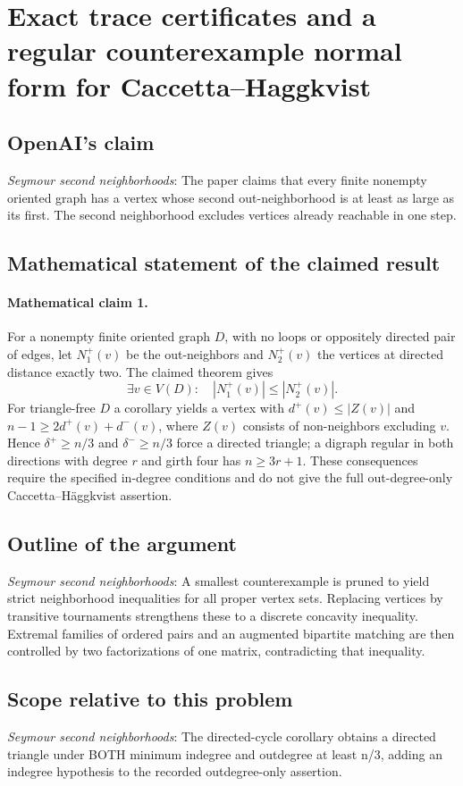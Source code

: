 \documentclass[11pt]{article}
\begin{document}
\section*{Exact trace certificates and a regular counterexample normal form for Caccetta--Haggkvist}

\subsection{OpenAI's claim}
\textit{Seymour second neighborhoods}: The paper claims that every finite nonempty oriented graph has a vertex whose second out-neighborhood is at least as large as its first. The second neighborhood excludes vertices already reachable in one step.

\subsection{Mathematical statement of the claimed result}
\paragraph{Mathematical claim 1.} For a nonempty finite oriented graph $D$, with no loops or oppositely directed pair of edges, let $N_1^+(v)$ be the out-neighbors and $N_2^+(v)$ the vertices at directed distance exactly two. The claimed theorem gives \[\exists v\in V(D):\quad|N_1^+(v)|\le|N_2^+(v)|.\] For triangle-free $D$ a corollary yields a vertex with $d^+(v)\le|Z(v)|$ and $n-1\ge2d^+(v)+d^-(v)$, where $Z(v)$ consists of non-neighbors excluding $v$. Hence $\delta^+\ge n/3$ and $\delta^-\ge n/3$ force a directed triangle; a digraph regular in both directions with degree $r$ and girth four has $n\ge3r+1$. These consequences require the specified in-degree conditions and do not give the full out-degree-only Caccetta--H\"aggkvist assertion.

\subsection{Outline of the argument}
\textit{Seymour second neighborhoods}: A smallest counterexample is pruned to yield strict neighborhood inequalities for all proper vertex sets. Replacing vertices by transitive tournaments strengthens these to a discrete concavity inequality. Extremal families of ordered pairs and an augmented bipartite matching are then controlled by two factorizations of one matrix, contradicting that inequality.

\subsection{Scope relative to this problem}
\textit{Seymour second neighborhoods}: The directed-cycle corollary obtains a directed triangle under BOTH minimum indegree and outdegree at least n/3, adding an indegree hypothesis to the recorded outdegree-only assertion.
\end{document}

